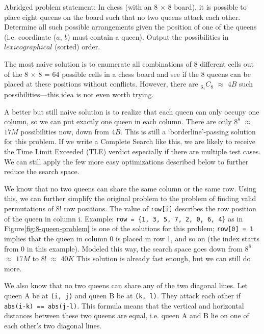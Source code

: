 Abridged problem statement: In chess (with an $8$ × $8$ board), it is possible to place eight queens on the board such that no two queens attack each other. Determine all such possible arrangements given the position of one of the queens (i.e. coordinate ($a$, $b$) must contain a queen). Output the possibilities in $lexicographical$ (sorted) order.

\hspace{7mm}The most naive solution is to enumerate all combinations of 8 different cells out of the
8 × 8 = 64 possible cells in a chess board and see if the 8 queens can be placed at these positions without conflicts. However, there are $_6_4C_8$ $\approx$ $4B$ such possibilities—this idea is not even worth trying.
 
\hspace{7mm}A better but still naive solution is to realize that each queen can only occupy one column, so we can put exactly one queen in each column. There are only $8^8$ $\approx$ $17M$ possibilities now,
down from $4B$. This is still a ‘borderline’-passing solution for this problem. If we write a Complete Search like this, we are likely to receive the Time Limit Exceeded (TLE) verdict especially if there are multiple test cases. We can still apply the few more easy optimizations described below to further reduce the search space.

\hspace{7mm}We know that no two queens can share the same column or the
same row. Using this, we can further simplify the original problem
to the problem of finding valid permutations of 8! row positions.
The value of \lstinline|row[i]| describes the row position of the queen in
column i. Example: \lstinline|row = {1, 3, 5, 7, 2, 0, 6, 4}| as in Figure\ref{fig:8-queen-problem} is one of the solutions for this problem;  \lstinline|row[0] = 1| implies that the queen in column 0 is placed in row 1, and so on (the index starts from 0 in this example). Modeled this way, the search space goes down from $8^8$ $\approx$ $17M$ to $8!$ $\approx$ $40K$  This solution is already fast enough, but we can still do more.

\hspace{7mm}We also know that no two queens can share any of the two diagonal lines. Let queen A be at \lstinline|(i, j)| and queen B be at \lstinline|(k, l)|. They attack each other if \lstinline|abs(i-k) == abs(j-l)|. This formula means that the vertical and horizontal distances between these two queens are equal, i.e. queen A and B lie on one of each other’s two diagonal lines.

